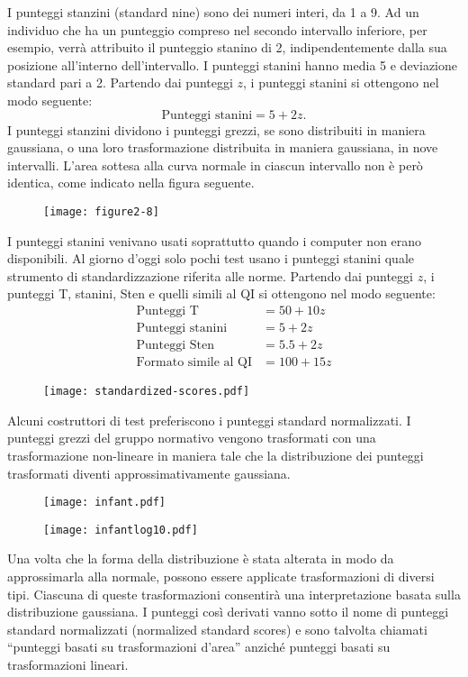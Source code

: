 I punteggi stanzini (standard nine) sono dei numeri interi, da 1 a 9.
 Ad un individuo che ha un punteggio compreso nel secondo intervallo inferiore, per esempio, verrà attribuito il punteggio stanino di 2, indipendentemente dalla sua posizione all'interno dell'intervallo.
 I punteggi stanini hanno media 5 e deviazione standard pari a 2.
Partendo dai punteggi $z$, i punteggi stanini si ottengono nel modo seguente:
$$
\text{Punteggi stanini} = 5 + 2z.
$$
I punteggi stanzini dividono i punteggi grezzi, se sono distribuiti in maniera gaussiana, o una loro trasformazione distribuita in maniera gaussiana, in nove intervalli.
 L'area sottesa alla curva normale in ciascun intervallo non è però identica, come indicato nella figura seguente.
\begin{figure}[h!]
\begin{center}
\texttt{[image: figure2-8]}
\end{center}
\end{figure}
I punteggi stanini venivano usati soprattutto quando i computer non erano disponibili.
 Al giorno d'oggi solo pochi test usano i punteggi stanini quale strumento di standardizzazione riferita alle norme.
Partendo dai punteggi $z$, i punteggi T, stanini, Sten e quelli simili al QI si ottengono nel modo seguente:
\begin{align*}
\text{Punteggi T} &= 50 + 10z\\
\text{Punteggi stanini} &= 5 + 2z\\
\text{Punteggi Sten} &= 5.5 + 2z\\
\text{Formato simile al QI} &= 100 + 15z
\end{align*}
\begin{figure}[h!]
\begin{center}
\texttt{[image: standardized-scores.pdf]}
\end{center}
\end{figure}

Alcuni costruttori di test preferiscono i punteggi standard normalizzati.
 I punteggi grezzi del gruppo normativo vengono trasformati con una trasformazione non-lineare in maniera tale che la distribuzione dei punteggi trasformati diventi approssimativamente gaussiana.
\begin{figure}[h!]
\begin{center}
\texttt{[image: infant.pdf]}
\end{center}
\end{figure}
\begin{figure}[h!]
\begin{center}
\texttt{[image: infantlog10.pdf]}
\end{center}
\end{figure}
Una volta che la forma della distribuzione è stata alterata in modo da approssimarla alla normale, possono essere applicate  trasformazioni di diversi tipi.
 Ciascuna di queste trasformazioni consentirà una interpretazione basata sulla distribuzione gaussiana.
 I punteggi così derivati vanno sotto il nome di punteggi standard normalizzati (normalized standard scores) e sono talvolta chiamati ``punteggi basati su trasformazioni d'area'' anziché punteggi basati su trasformazioni lineari.




